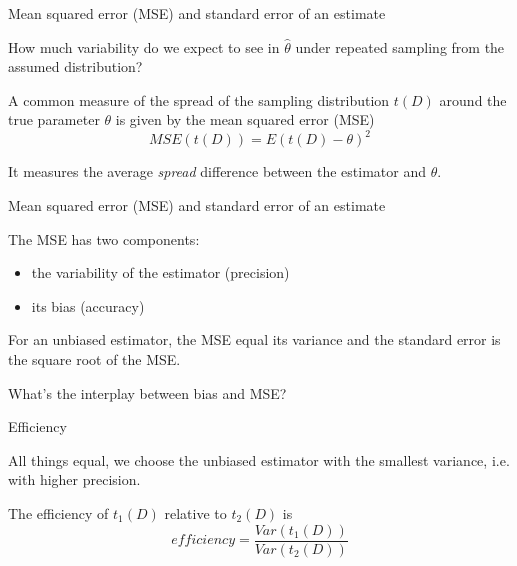 \documentclass{beamer}
\begin{document}
\begin{frame}{Mean squared error (MSE) and standard error of an estimate}
	
	How much variability do we expect to see in $\hat{\theta}$ under repeated sampling from the 
	assumed distribution?

	\vskip 0.5cm

	\pause

	A common measure of the spread of the sampling distribution $t(D)$ around the true parameter $\theta$ is given by 
	the mean squared error (MSE)
	\begin{equation*}
		MSE(t(D)) = E{(t(D)-\theta)^2}
	\end{equation*}

	It measures the average \textit{spread} difference between the estimator and $\theta$.

\end{frame}

\begin{frame}{Mean squared error (MSE) and standard error of an estimate}

	The MSE has two components:
	\begin{itemize}
		\item the variability of the estimator (precision)
		\item its bias (accuracy)
	\end{itemize}

	\vskip 0.5cm

	For an unbiased estimator, the MSE equal its variance and the standard error is the square root of the MSE.

	\small{What's the interplay between bias and MSE?}

\end{frame}

\begin{frame}{Efficiency}

	All things equal, we choose the unbiased estimator with the smallest variance, i.e. with higher precision.

	\vskip 1cm

	The efficiency of $t_1(D)$ relative to $t_2(D)$ is
	\begin{equation*}
		efficiency = \frac{Var(t_1(D))}{Var(t_2(D))}
	\end{equation*}

\end{frame}
\end{document}

